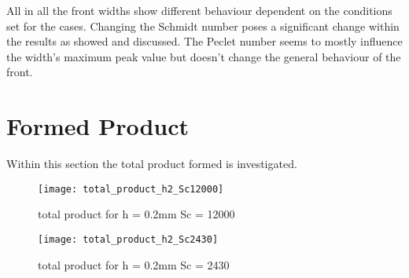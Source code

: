 \documentclass[../thesis.tex]{subfiles}
\begin{document}
All in all the front widths show different behaviour dependent on the conditions set for the cases. Changing the Schmidt number poses a significant change within the results as showed and discussed. The Peclet number seems to mostly influence the width's maximum peak value but doesn't change the general behaviour of the front.

\section{Formed Product}

Within this section the total product formed is investigated.

\begin{figure}[htbp]
	\centering
	\texttt{[image: total\_product\_h2\_Sc12000]}
	\caption{total product for  h = 0.2mm Sc = 12000\label{fig: total_prod_h2_Sc12000}}\bigskip
	\texttt{[image: total\_product\_h2\_Sc2430]}
	\caption{total product for  h = 0.2mm Sc = 2430\label{fig: total_prod_h2_Sc2430}}
\end{figure}
\end{document}

